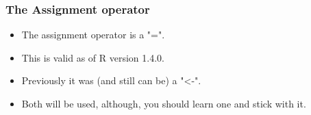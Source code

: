 \begin{frame}
\frametitle{The Assignment operator}

\begin{itemize}
\item The assignment operator is a "=". \item This is valid as of R version 1.4.0.
\item  Previously it was (and still can be) a "<-".
\item 
Both will be used, although, you should learn one and stick with it.
\end{itemize}
\end{frame}

